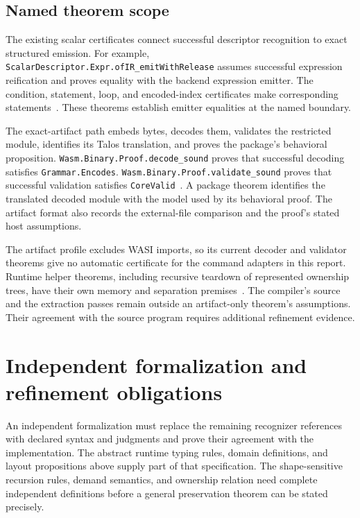 \documentclass[11pt]{article}
\newcommand{\code}[1]{\texttt{#1}}
\begin{document}
\subsection{Named theorem scope}

The existing scalar certificates connect successful descriptor recognition to exact structured emission.  For example, \code{ScalarDescriptor.Expr.ofIR\_emitWithRelease} assumes successful expression reification and proves equality with the backend expression emitter.  The condition, statement, loop, and encoded-index certificates make corresponding statements~\cite{certificates}.  These theorems establish emitter equalities at the named boundary.

The exact-artifact path embeds bytes, decodes them, validates the restricted module, identifies its Talos translation, and proves the package's behavioral proposition.  \code{Wasm.Binary.Proof.decode\_sound} proves that successful decoding satisfies \code{Grammar.Encodes}.  \code{Wasm.Binary.Proof.validate\_sound} proves that successful validation satisfies \code{CoreValid}~\cite{artifact}.  A package theorem identifies the translated decoded module with the model used by its behavioral proof.  The artifact format also records the external-file comparison and the proof's stated host assumptions.

The artifact profile excludes WASI imports, so its current decoder and validator theorems give no automatic certificate for the command adapters in this report.  Runtime helper theorems, including recursive teardown of represented ownership trees, have their own memory and separation premises~\cite{artifact}.  The compiler's source and the extraction passes remain outside an artifact-only theorem's assumptions.  Their agreement with the source program requires additional refinement evidence.

\section{Independent formalization and refinement obligations}

An independent formalization must replace the remaining recognizer references with declared syntax and judgments and prove their agreement with the implementation.  The abstract runtime typing rules, domain definitions, and layout propositions above supply part of that specification.  The shape-sensitive recursion rules, demand semantics, and ownership relation need complete independent definitions before a general preservation theorem can be stated precisely.
\end{document}
